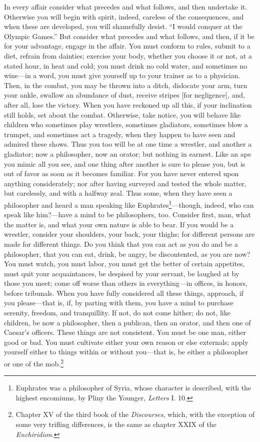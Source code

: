 In every affair consider what precedes and what follows, and then undertake it.
Otherwise you will begin with spirit, indeed, careless of the consequences, and
when these are developed, you will  shamefully desist. ``I would conquer at the
Olympic Games.'' But  consider what precedes and what follows,  and then, if it
be for your advantage, engage in the  affair. You must conform to rules, submit
to a diet, refrain from dainties; exercise  your body, whether you choose it or
not, at  a stated hour,  in heat and  cold; you must  drink no cold  water, and
sometimes no wine---in a word, you must  give yourself up to your trainer as to
a physician.  Then, in the  combat, you may be  thrown into a  ditch, dislocate
your arm, turn  your ankle, swallow an abundance of  dust, receive stripes [for
negligence], and,  after all, lose the  victory. When you have  reckoned up all
this, if  your inclination still holds,  set about the combat.  Otherwise, take
notice, you will  behave like children who sometimes  play wrestlers, sometimes
gladiators, sometimes  blow a trumpet, and  sometimes act a tragedy,  when they
happen to have seen and admired these shows. Thus you too will be at one time a
wrestler,  and another  a  gladiator; now  a philosopher,  now  an orator;  but
nothing in  earnest. Like an  ape you  mimic all you  see, and one  thing after
another is  sure to  please you,  but is  out of  favor as  soon as  it becomes
familiar. For  you have  never entered upon  anything considerately;  nor after
having surveyed and tested the whole matter, but carelessly, and with a halfway
zeal. Thus  some, when they  have seen a philosopher  and heard a  man speaking
like Euphrates\footnote{Euphrates  was a philosopher of  Syria, whose character
is described, with the highest  encomiums, by Pliny the Younger, \emph{Letters}
I.  10.}---though,  indeed,  who  can  speak like  him?---have  a  mind  to  be
philosophers, too. Consider  first, man, what the matter is,  and what your own
nature is able  to bear. If you  would be a wrestler,  consider your shoulders,
your back, your thighs; for different persons are made for different things. Do
you think that  you can act as you  do and be a philosopher, that  you can eat,
drink,  be  angry,  be discontented,  as  you  are  now?  You must  watch,  you
must  labor, you  must get  the  better of  certain appetites,  must quit  your
acquaintances, be  despised by your servant,  be laughed at by  those you meet;
come  off worse  than  others  in everything---in  offices,  in honors,  before
tribunals. When  you have fully considered  all these things, approach,  if you
please---that  is, if,  by  parting with  them,  you have  a  mind to  purchase
serenity, freedom, and  tranquillity. If not, do not come  hither; do not, like
children, be now a  philosopher, then a publican, then an  orator, and then one
of Caesar's  officers. These things  are not consistent.  You must be  one man,
either  good  or  bad. You  must  cultivate  either  your  own reason  or  else
externals; apply yourself either to things  within or without you---that is, be
either a philosopher  or one of the mob.\footnote{Chapter XV  of the third book
of  the \emph{Discourses},  which, with  the  exception of  some very  trifling
differences, is the same as chapter XXIX of the \emph{Enchiridion}.}

